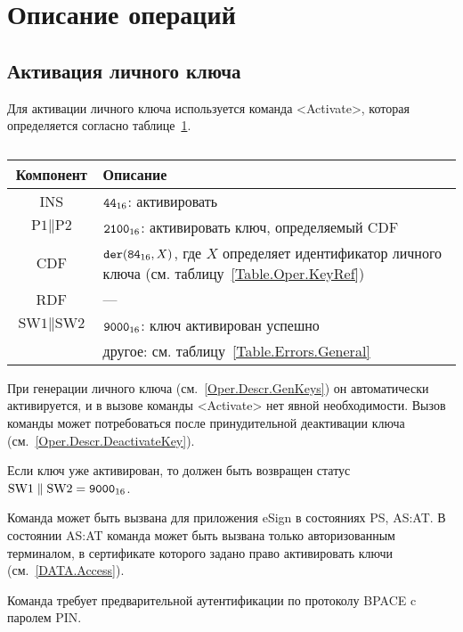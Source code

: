 \section{Описание операций}\label{Oper.Descr}

\subsection{Активация личного ключа}\label{Oper.Descr.ActivateKey}

Для активации личного ключа используется команда <Activate>,
которая определяется согласно таблице~\ref{Table.Oper.ActivateCmd}.

\begin{table}[hbt]
\caption{}\label{Table.Oper.ActivateCmd}
\begin{tabular}{|c|p{14cm}|}
\hline
Компонент & Описание\\
\hline
\hline
INS & $\texttt{44}_{16}$: активировать\\
\hline
$\text{P1} \parallel \text{P2}$ & $\texttt{2100}_{16}$: 
активировать ключ, определяемый CDF\\
\hline
CDF &  $\texttt{der}(\texttt{84}_{16}, X)$,   
где $X$ определяет идентификатор личного ключа 
(см. таблицу~\ref{Table.Oper.KeyRef}) \\ 
\hline
RDF &  --- \\
\hline
$\text{SW1} \parallel \text{SW2}$ & $\texttt{9000}_{16}$: ключ активирован успешно \\
  & другое: см. таблицу~\ref{Table.Errors.General} \\
\hline
\end{tabular}
\end{table}


При генерации личного ключа (см.~\ref{Oper.Descr.GenKeys})
он автоматически активируется, 
и в вызове команды <Activate> нет явной необходимости. 
Вызов команды может потребоваться после 
принудительной деактивации ключа (см.~\ref{Oper.Descr.DeactivateKey}).  

Если ключ уже активирован, то должен быть 
возвращен статус $\text{SW1} \parallel \text{SW2} = \texttt{9000}_{16}$.

Команда может быть вызвана для приложения eSign в состояниях PS, AS:AT.
В состоянии AS:AT команда может быть вызвана только
авторизованным терминалом, в сертификате которого задано право
активировать ключи (см.~\ref{DATA.Access}).

Команда требует предварительной аутентификации 
по протоколу BPACE c паролем PIN.

